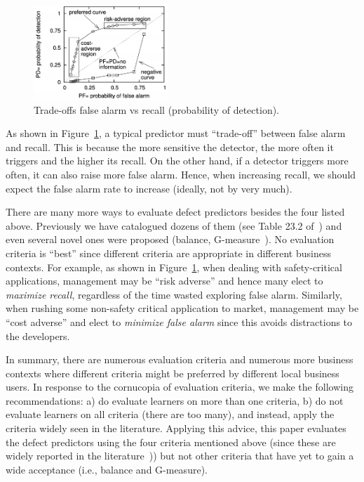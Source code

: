 \documentclass[sigconf,review, anonymous]{acmart}
\theoremstyle{break}
\theoremstyle{break}
\begin{document}
 \begin{figure}
\begin{center}
\includegraphics[width=2.0in]{roc.png}
\end{center}
\vspace{-0.2cm}
\caption{Trade-offs false alarm vs
recall (probability of detection).  }\label{fig:trade}
 \end{figure}
As shown in Figure~\ref{fig:trade},
a typical predictor must ``trade-off''
between false alarm and recall.
This is because the  more sensitive the detector, the more often it triggers and the higher its recall. On the other hand,  if a detector triggers more often, it can also raise more false alarm.
Hence, when increasing recall, we  should  expect
the false alarm rate to  increase
(ideally, not by very much).

There are many more ways to evaluate defect predictors besides the four listed above.
Previously we have catalogued dozens of them (see Table 23.2 of~\cite{menzies2014sharing}) and even several novel ones were proposed
(balance, G-measure~\cite{menzies2007data}).  
No evaluation criteria is ``best'' since different  criteria are appropriate in different business contexts. For example, as shown
in 
Figure~\ref{fig:trade},
when dealing
with safety-critical applications, management may be
``risk adverse'' and hence many elect
 to {\em maximize recall}, regardless of the time wasted exploring  false alarm.
 Similarly, 
when rushing some non-safety critical application to market, management may be ``cost adverse''
and elect to {\em minimize false alarm} since this avoids distractions to the developers. 



In summary, there are  numerous evaluation criteria and  numerous more business contexts
where different criteria might be preferred by different local business users. In response to
the cornucopia of evaluation criteria, we make the following recommendations: a) do evaluate learners on more than one criteria, b) do not evaluate learners on  all criteria (there are too many), and instead, apply the criteria widely seen in the literature. Applying this advice, this paper  evaluates the defect predictors using the four criteria
mentioned above (since these are widely reported in the literature~\cite{ghotra2015revisiting,fu2016tuning})) but not other 
 criteria  that  have yet to gain a wide acceptance 
 (i.e., balance and G-measure).
 
\end{document}
